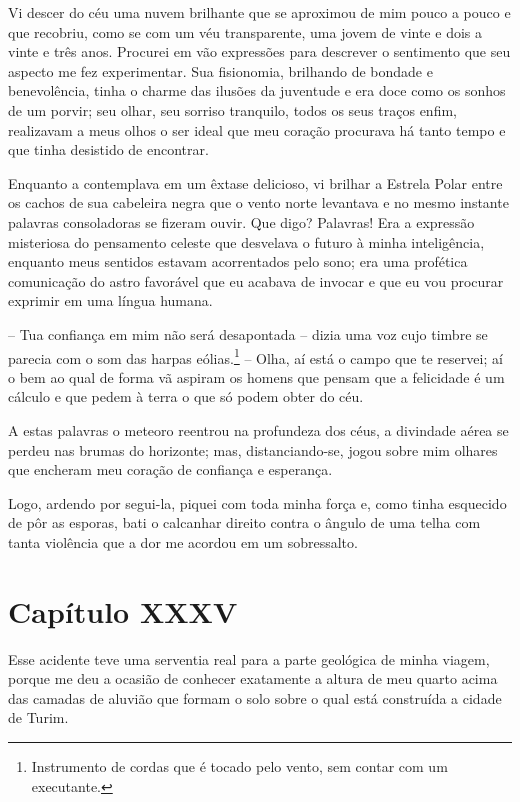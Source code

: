  Vi descer do céu uma nuvem brilhante que se aproximou de mim pouco a
pouco e que recobriu, como se com um véu transparente, uma jovem de
vinte e dois a vinte e três anos. Procurei em vão expressões para
descrever o sentimento que seu aspecto me fez experimentar. Sua
fisionomia, brilhando de bondade e benevolência, tinha o charme das
ilusões da juventude e era doce como os sonhos de um porvir; seu olhar,
seu sorriso tranquilo, todos os seus traços enfim, realizavam a meus olhos
o ser ideal que meu coração procurava há tanto tempo e que tinha
desistido de encontrar.

 Enquanto a contemplava em um êxtase delicioso, vi brilhar a Estrela
Polar entre os cachos de sua cabeleira negra que o vento norte
levantava e no mesmo instante palavras consoladoras se fizeram ouvir.
Que digo? Palavras! Era a expressão misteriosa do pensamento celeste
que desvelava o futuro à minha inteligência, enquanto meus sentidos
estavam acorrentados pelo sono; era uma profética comunicação do astro
favorável que eu acabava de invocar e que eu vou procurar exprimir em
uma língua humana.

 -- Tua confiança em mim não será desapontada -- dizia uma voz cujo
timbre se parecia com o som das harpas eólias.\footnote{ Instrumento de
cordas que é tocado pelo vento, sem contar com um executante.} -- Olha,
aí está o campo que te reservei; aí o bem ao qual de forma vã aspiram
os homens que pensam que a felicidade é um cálculo e que pedem à terra
o que só podem obter do céu.

 A estas palavras o meteoro reentrou na profundeza dos céus, a divindade
aérea se perdeu nas brumas do horizonte; mas, distanciando-se, jogou
sobre mim olhares que encheram meu coração de confiança e esperança.

 Logo, ardendo por segui-la, piquei com toda minha força e, como tinha
esquecido de pôr as esporas, bati o calcanhar direito contra o ângulo
de uma telha com tanta violência que a dor me acordou em um
sobressalto.

\section*{Capítulo XXXV}

 Esse acidente teve uma serventia real para a parte geológica de minha
viagem, porque me deu a ocasião de conhecer exatamente a altura de meu
quarto acima das camadas de aluvião que formam o solo sobre o qual está
construída a cidade de Turim.


